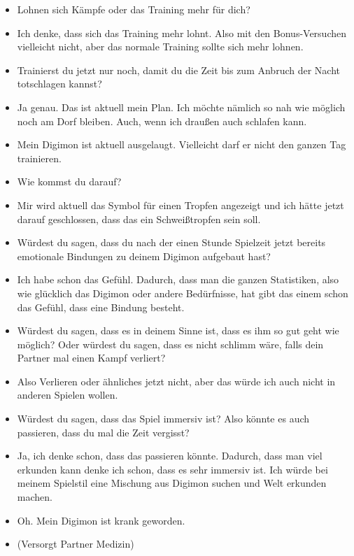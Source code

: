 {\begin{itemize}[]
    \item {} Lohnen sich Kämpfe oder das Training mehr für dich?
    \item {} Ich denke, dass sich das Training mehr lohnt. Also mit den Bonus-Versuchen vielleicht nicht, aber das normale Training sollte sich mehr lohnen.
    \item {} Trainierst du jetzt nur noch, damit du die Zeit bis zum Anbruch der Nacht totschlagen kannst? 
    \item {} Ja genau. Das ist aktuell mein Plan. Ich möchte nämlich so nah wie möglich noch am Dorf bleiben. Auch, wenn ich draußen auch schlafen kann. 
    \item {} Mein Digimon ist aktuell ausgelaugt. Vielleicht darf er nicht den ganzen Tag trainieren.
    \item {} Wie kommst du darauf?
    \item {} Mir wird aktuell das Symbol für einen Tropfen angezeigt und ich hätte jetzt darauf geschlossen, dass das ein Schweißtropfen sein soll.
    \item {} Würdest du sagen, dass du nach der einen Stunde Spielzeit jetzt bereits emotionale Bindungen zu deinem Digimon aufgebaut hast?
    \item {} Ich habe schon das Gefühl. Dadurch, dass man die ganzen Statistiken, also wie glücklich das Digimon oder andere Bedürfnisse, hat gibt das einem schon das Gefühl, dass eine Bindung besteht. 
    \item {} Würdest du sagen, dass es in deinem Sinne ist, dass es ihm so gut geht wie möglich? Oder würdest du sagen, dass es nicht schlimm wäre, falls dein Partner mal einen Kampf verliert?
    \item {} Also Verlieren oder ähnliches jetzt nicht, aber das würde ich auch nicht in anderen Spielen wollen. 
    \item {} Würdest du sagen, dass das Spiel immersiv ist? Also könnte es auch passieren, dass du mal die Zeit vergisst?
    \item {} Ja, ich denke schon, dass das passieren könnte. Dadurch, dass man viel erkunden kann denke ich schon, dass es sehr immersiv ist. Ich würde bei meinem Spielstil eine Mischung aus Digimon suchen und Welt erkunden machen.
    \item {} Oh. Mein Digimon ist krank geworden.
    \item {} (Versorgt Partner Medizin)

\end{itemize}}

